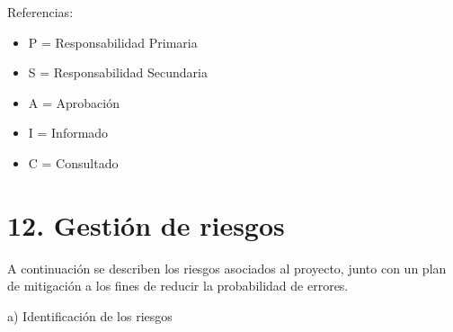 \documentclass[11pt]{charter}
\begin{document}
{\footnotesize
Referencias:
\begin{itemize}
	\item P = Responsabilidad Primaria
	\item S = Responsabilidad Secundaria
	\item A = Aprobación
	\item I = Informado
	\item C = Consultado
\end{itemize}
} %

\section{12. Gestión de riesgos}
\label{sec:riesgos}

A continuación se describen los riesgos asociados al proyecto, junto con un plan de mitigación a los fines de reducir la probabilidad de errores.

a) Identificación de los riesgos
\end{document}
